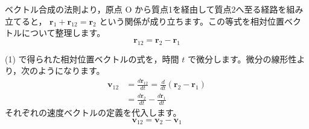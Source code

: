 \solutionheading
\begin{solutionparts}

ベクトル合成の法則より，原点 O から質点1を経由して質点2へ至る経路を組み立てると， $\boldsymbol{r}_1 + \boldsymbol{r}_{12} = \boldsymbol{r}_2$ という関係が成り立ちます。この等式を相対位置ベクトルについて整理します。
\begin{equation*}
\boldsymbol{r}_{12} = \boldsymbol{r}_2 - \boldsymbol{r}_1
\end{equation*}

(1) で得られた相対位置ベクトルの式を，時間 $t$ で微分します。微分の線形性より，次のようになります。
\begin{align*}
\boldsymbol{v}_{12}
  &= \frac{d\boldsymbol{r}_{12}}{dt}
   = \frac{d}{dt}(\boldsymbol{r}_2-\boldsymbol{r}_1) \\
  &= \frac{d\boldsymbol{r}_2}{dt}
   - \frac{d\boldsymbol{r}_1}{dt}
\end{align*}
それぞれの速度ベクトルの定義を代入します。
\begin{equation*}
\boldsymbol{v}_{12} = \boldsymbol{v}_2 - \boldsymbol{v}_1
\end{equation*}


\end{solutionparts}
